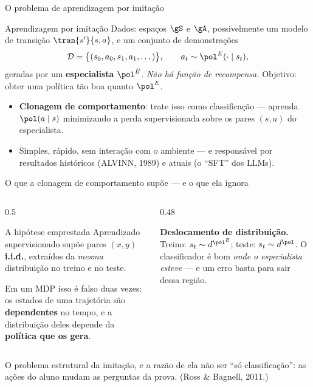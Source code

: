 \documentclass[aspectratio=169, 11pt]{beamer}
\newcommand{\polE}{\pol^{E}}                     %
\newcommand{\Dset}{\mathcal{D}}
\begin{document}
\begin{frame}{O problema de aprendizagem por imitação}

  \begin{defbox}{Aprendizagem por imitação}
    Dados: espaços $\gS$ e $\gA$, possivelmente um modelo de transição
    $\tran{s'}{s,a}$, e um conjunto de demonstrações
    \[
      \Dset = \bigl\{(s_0, a_0, s_1, a_1, \dots)\bigr\},
      \qquad a_t \sim \polE(\cdot \mid s_t),
    \]
    geradas por um \textbf{especialista} $\polE$. \emph{Não há função de
    recompensa.} Objetivo: obter uma política tão boa quanto $\polE$.
  \end{defbox}

  \begin{itemize}\setlength{\itemsep}{0.3ex}
    \item \textbf{Clonagem de comportamento}: trate isso como
      classificação --- aprenda $\pol(a\mid s)$ minimizando a perda
      supervisionada sobre os pares $(s,a)$ do especialista.
    \item Simples, rápido, sem interação com o ambiente --- e responsável por
      resultados históricos (ALVINN, 1989) e atuais (o ``SFT'' dos LLMs).
  \end{itemize}
\end{frame}

\begin{frame}{O que a clonagem de comportamento supõe --- e o que ela ignora}

  \begin{columns}[T]
  \begin{column}{0.5\textwidth}
    \begin{defbox}{A hipótese emprestada}
      Aprendizado supervisionado supõe pares $(x,y)$ \textbf{i.i.d.},
      extraídos da \emph{mesma} distribuição no treino e no teste.
    \end{defbox}
    \smallskip
    Em um MDP isso é falso duas vezes: os estados de uma trajetória são
    \textbf{dependentes} no tempo, e a distribuição deles depende da
    \textbf{política que os gera}.
  \end{column}
  \begin{column}{0.48\textwidth}
    \begin{alertabox}
      \textbf{Deslocamento de distribuição.} Treino: $s_t \sim d^{\polE}$;
      teste: $s_t \sim d^{\pol}$. O classificador é bom \emph{onde o
      especialista esteve} --- e um erro basta para sair dessa região.
    \end{alertabox}
  \end{column}
  \end{columns}

  \begin{ideiabox}
    O problema estrutural da imitação, e a razão de ela não ser ``só
    classificação'': as ações do aluno mudam as perguntas da prova.
    {\scriptsize\color{rlCinza}\;(Ross \& Bagnell, 2011.)}
  \end{ideiabox}
\end{frame}
\end{document}
